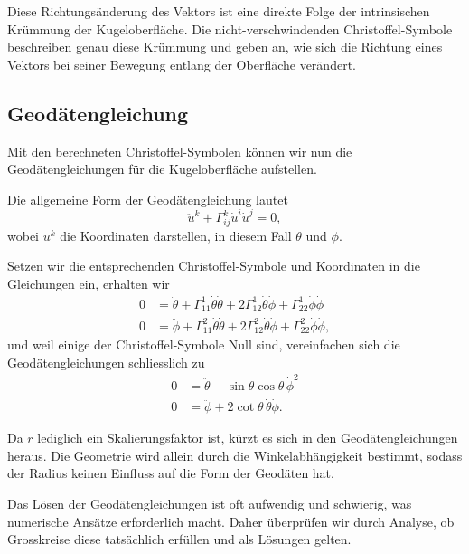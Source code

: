 Diese Richtungsänderung des Vektors ist eine direkte Folge der intrinsischen Krümmung der Kugeloberfläche.
Die nicht-verschwindenden Christoffel-Symbole beschreiben genau diese Krümmung und geben an, wie sich die Richtung eines Vektors bei seiner Bewegung entlang der Oberfläche verändert.

\subsection{Geodätengleichung}
Mit den berechneten Christoffel-Symbolen können wir nun die Geodätengleichungen für die Kugeloberfläche aufstellen.

Die allgemeine Form der Geodätengleichung lautet
\begin{equation}
	\ddot{u}^k + \Gamma^k_{ij} \dot{u}^i \dot{u}^j = 0,
\end{equation}
wobei $u^k$ die Koordinaten darstellen, in diesem Fall $\theta$ und $\phi$.

Setzen wir die entsprechenden Christoffel-Symbole und Koordinaten in die Gleichungen ein, erhalten wir
\begin{equation}
	\begin{aligned} 
		0 &= \ddot{\theta} + \Gamma^1_{11} \dot{\theta} \dot{\theta} + 2\Gamma^1_{12} \dot{\theta}\dot{\phi} + \Gamma^1_{22} \dot{\phi} \dot{\phi} \\
		0 &= \ddot{\phi} + \Gamma^2_{11} \dot{\theta} \dot{\theta} + 2\Gamma^2_{12} \dot{\theta}\dot{\phi} + \Gamma^2_{22} \dot{\phi} \dot{\phi},
	\end{aligned}
\end{equation}
und weil einige der Christoffel-Symbole Null sind, vereinfachen sich die Geodätengleichungen schliesslich zu
\begin{align}
	0 &= \ddot{\theta} - \sin\theta \cos\theta \, \dot{\phi}^2 \\
	0 &= \ddot{\phi} + 2 \cot\theta \, \dot{\theta} \dot{\phi}.
\end{align}

Da $r$ lediglich ein Skalierungsfaktor ist, kürzt es sich in den Geodätengleichungen heraus. 
Die Geometrie wird allein durch die Winkelabhängigkeit bestimmt, sodass der Radius keinen Einfluss auf die Form der Geodäten hat.

Das Lösen der Geodätengleichungen ist oft aufwendig und schwierig, was numerische Ansätze erforderlich macht. 
Daher überprüfen wir durch Analyse, ob Grosskreise diese tatsächlich erfüllen und als Lösungen gelten.

